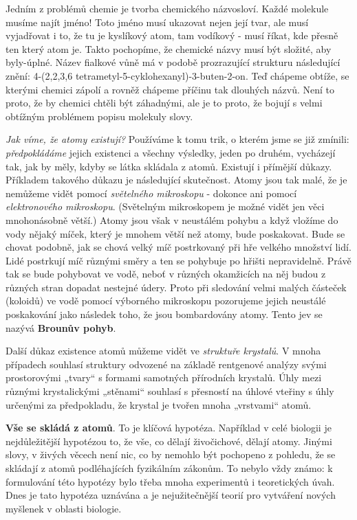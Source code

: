 {      Jedním z problémů chemie je tvorba chemického názvosloví. Každé molekule musíme najít jméno! 
      Toto jméno musí ukazovat nejen její tvar, ale musí vyjadřovat i to, že tu je kyslíkový atom, 
      tam vodíkový - musí říkat, kde přesně ten který atom je. Takto pochopíme, že chemické názvy 
      musí být složité, aby byly-úplné. Název fialkové vůně má v podobě prozrazující strukturu 
      následující znění: 4-(2,2,3,6 tetrametyl-5-cyklohexa\-nyl)-3-buten-2-on. Teď chápeme obtíže, 
      se kterými chemici zápolí a rovněž chápeme příčinu tak dlouhých názvů. Není to proto, že by 
      chemici chtěli být záhadnými, ale je to proto, že bojují s velmi obtížným problémem popisu 
      molekuly slovy.
      
      \emph{Jak víme, že atomy existují?} Používáme k tomu trik, o kterém jsme se již zmínili: 
      \emph{předpokládáme} jejich existenci a všechny výsledky, jeden po druhém, vycházejí tak, jak 
      by měly, kdyby se látka skládala z atomů. Existují i přímější důkazy. Příkladem takového 
      důkazu je následující skutečnost. Atomy jsou tak malé, že je nemůžeme vidět pomocí 
      \emph{světelného mikroskopu} - dokonce ani pomocí \emph{elektronového mikroskopu}. (Světelným 
      mikroskopem je možné vidět jen věci mnohonásobně větší.) Atomy jsou však v neustálém pohybu a 
      když vložíme do vody nějaký míček, který je mnohem větší než atomy, bude poskakovat. Bude se 
      chovat podobně, jak se chová velký míč postrkovaný při hře velkého množství lidí. Lidé 
      postrkují míč různými směry a ten se pohybuje po hřišti nepravidelně. Právě tak se bude 
      pohybovat  ve vodě, neboť v různých okamžicích na něj budou z různých stran 
      dopadat nestejné údery. Proto při sledování velmi malých částeček (koloidů) ve vodě pomocí 
      výborného mikroskopu pozorujeme jejich neustálé poskakování jako následek toho, že jsou 
      bombardovány atomy. Tento jev se nazývá \textbf{Brounův pohyb}.
      
      Další důkaz existence atomů můžeme vidět ve \emph{struktuře krystalů}. V mnoha případech 
      souhlasí struktury odvozené na základě rentgenové analýzy svými prostorovými „tvary“ s 
      formami samotných přírodních krystalů. Úhly mezi různými krystalickými „stěnami“ souhlasí s 
      přesností na úhlové vteřiny s úhly určenými za předpokladu, že krystal je tvořen mnoha 
      „vrstvami“ atomů.
      
      \textbf{Vše se skládá z atomů}. To je klíčová hypotéza. Například v celé biologii je 
      nejdůležitější hypotézou to, že vše, co dělají živočichové, dělají atomy. Jinými slovy, v 
      živých věcech není nic, co by nemohlo být pochopeno z pohledu, že se skládají z atomů 
      podléhajících fyzikálním zákonům. To nebylo vždy známo: k formulování této hypotézy bylo 
      třeba mnoha experimentů i teoretických úvah. Dnes je tato hypotéza uznávána a je 
      nejužitečnější teorií pro vytváření nových myšlenek v oblasti biologie.
      
}
